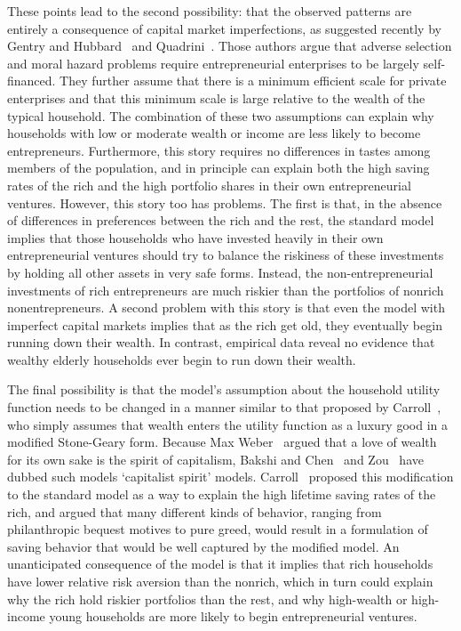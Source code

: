 \documentclass[12pt]{article}
\begin{document}
These points lead to the second possibility: that the observed patterns are
entirely a consequence of capital market imperfections, as suggested
recently by Gentry and Hubbard~\cite{gentry&hubbard:wealthysave} and
Quadrini~\cite{quadrini:entrepreneurship}. Those authors argue that adverse
selection and moral hazard problems require entrepreneurial enterprises to
be largely self-financed. They further assume that there is a minimum
efficient scale for private enterprises and that this minimum scale is large
relative to the wealth of the typical household. The combination of these
two assumptions can explain why households with low or moderate wealth or
income are less likely to become entrepreneurs. Furthermore, this story
requires no differences in tastes among members of the population, and in
principle can explain both the high saving rates of the rich and the high
portfolio shares in their own entrepreneurial ventures. However, this story
too has problems. The first is that, in the absence of differences in
preferences between the rich and the rest, the standard model implies that
those households who have invested heavily in their own entrepreneurial
ventures should try to balance the riskiness of these investments by holding
all other assets in very safe forms. Instead, the non-entrepreneurial
investments of rich entrepreneurs are much riskier than the portfolios of
nonrich nonentrepreneurs. A second problem with this story is that even the
model with imperfect capital markets implies that as the rich get old, they
eventually begin running down their wealth. In contrast, empirical data
reveal no evidence that wealthy elderly households ever begin to run down
their wealth.

The final possibility is that the model's assumption about the household
utility function needs to be changed in a manner similar to that proposed by
Carroll~\cite{carroll:richsave}, who simply assumes that wealth enters the
utility function as a luxury good in a modified Stone-Geary form. Because
Max Weber~\cite{weber:capitalism} argued that a love of wealth for its own
sake is the spirit of capitalism, Bakshi and Chen~\cite{bakshi&chen:spirit}
and Zou~\cite{zou:spirit} have dubbed such models `capitalist spirit'
models. Carroll~\cite{carroll:richsave} proposed this modification to the
standard model as a way to explain the high lifetime saving rates of the
rich, and argued that many different kinds of behavior, ranging from
philanthropic bequest motives to pure greed, would result in a formulation
of saving behavior that would be well captured by the modified model. An
unanticipated consequence of the model is that it implies that rich
households have lower relative risk aversion than the nonrich, which in turn
could explain why the rich hold riskier portfolios than the rest, and why
high-wealth or high-income young households are more likely to begin
entrepreneurial ventures.
\end{document}
